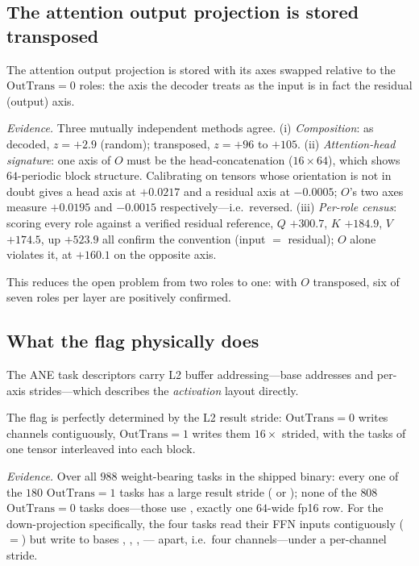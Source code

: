 \subsection{The attention output projection is stored transposed}

\begin{finding}\label{find:otrans}
The attention output projection is stored with its axes swapped relative to the
$\mathrm{OutTrans}{=}0$ roles: the axis the decoder treats as the input is in fact the residual
(output) axis.
\end{finding}
\noindent\emph{Evidence.} Three mutually independent methods agree.
(i) \emph{Composition}: as decoded, $z=+2.9$ (random); transposed, $z=+96$ to $+105$.
(ii) \emph{Attention-head signature}: one axis of $O$ must be the head-concatenation
($16\times64$), which shows $64$-periodic block structure. Calibrating on tensors whose orientation
is not in doubt gives a head axis at $+0.0217$ and a residual axis at $-0.0005$; $O$'s two axes
measure $+0.0195$ and $-0.0015$ respectively---i.e.\ reversed.
(iii) \emph{Per-role census}: scoring every role against a verified residual reference,
$Q$ $+300.7$, $K$ $+184.9$, $V$ $+174.5$, $\mathrm{up}$ $+523.9$ all confirm the convention
(input $=$ residual); $O$ alone violates it, at $+160.1$ on the opposite axis.

This reduces the open problem from two roles to one: with $O$ transposed, six of seven roles per
layer are positively confirmed.

\subsection{What the flag physically does}

The ANE task descriptors carry L2 buffer addressing---base addresses and per-axis strides---which
describes the \emph{activation} layout directly.

\begin{finding}[$\mathrm{OutTrans}{=}1$ is a strided, interleaved output write]\label{find:outtrans2}
The flag is perfectly determined by the L2 result stride: $\mathrm{OutTrans}{=}0$ writes channels
contiguously, $\mathrm{OutTrans}{=}1$ writes them $16\times$ strided, with the tasks of one tensor
interleaved into each block.
\end{finding}
\noindent\emph{Evidence.} Over all $988$ weight-bearing tasks in the shipped binary: every one of the
$180$ $\mathrm{OutTrans}{=}1$ tasks has a large result stride ( or ); none of
the $808$ $\mathrm{OutTrans}{=}0$ tasks does---those use , exactly one $64$-wide
\textrm{fp16} row. For the down-projection specifically, the four tasks read their FFN inputs
contiguously (${=}$) but write to bases , ,
, --- apart, i.e.\ four channels---under a 
per-channel stride.

